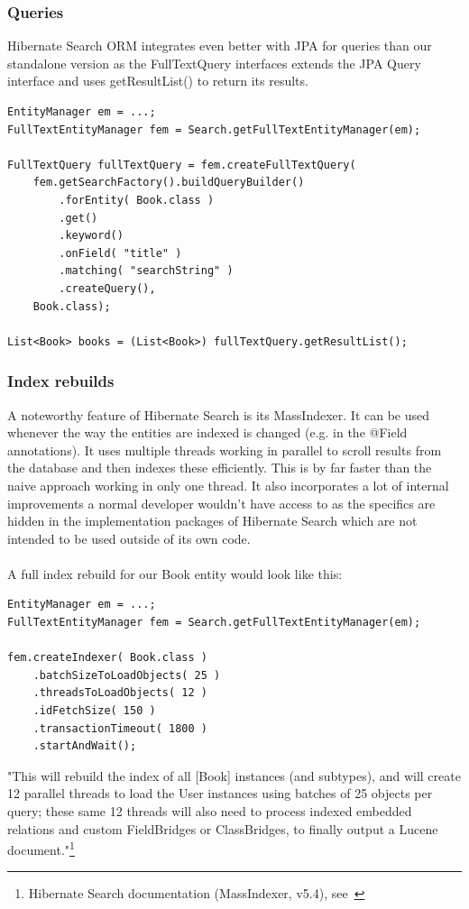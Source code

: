 \pagebreak

\subsubsection{Queries} \label{hsearch_orm_querying}
Hibernate Search ORM integrates even better with JPA for queries than our standalone version as the FullTextQuery interfaces extends the JPA Query interface and uses getResultList() to return its results.
\\
\lstset{language=java}
\begin{lstlisting}[frame=htrbl, caption={Querying with Hibernate Search ORM}, label={lst:querying_hsearch_orm.java_1}]
EntityManager em = ...;
FullTextEntityManager fem = Search.getFullTextEntityManager(em);

FullTextQuery fullTextQuery = fem.createFullTextQuery(
	fem.getSearchFactory().buildQueryBuilder()
		.forEntity( Book.class )
		.get()
		.keyword()
		.onField( "title" )
		.matching( "searchString" )
		.createQuery(), 
	Book.class);
	
List<Book> books = (List<Book>) fullTextQuery.getResultList();
\end{lstlisting}

\pagebreak

\subsubsection{Index rebuilds}
A noteworthy feature of Hibernate Search is its MassIndexer. It can be used whenever the way the entities are indexed is changed (e.g. in the @Field annotations). It uses multiple threads working in parallel to scroll results from the database and then indexes these efficiently. This is by far faster than the naive approach working in only one thread. It also incorporates a lot of internal improvements a normal developer wouldn't have access to as the specifics are hidden in the implementation packages of Hibernate Search which are not intended to be used outside of its own code.
\\\\
A full index rebuild for our Book entity would look like this:
\\
\lstset{language=java}
\begin{lstlisting}[frame=htrbl, caption={MassIndexer usage with Hibernate Search ORM}, label={lst:massindexing_hsearch_orm.java}]
EntityManager em = ...;
FullTextEntityManager fem = Search.getFullTextEntityManager(em);

fem.createIndexer( Book.class )
	.batchSizeToLoadObjects( 25 )
	.threadsToLoadObjects( 12 )
	.idFetchSize( 150 )
	.transactionTimeout( 1800 )
	.startAndWait();
\end{lstlisting}
\noindent
"This will rebuild the index of all [Book] instances (and subtypes), and will create 12 parallel threads to load the User instances using batches of 25 objects per query; these same 12 threads will also need to process indexed embedded relations and custom FieldBridges or ClassBridges, to finally output a Lucene document."\footnote{Hibernate Search documentation (MassIndexer, v5.4), see~\cite{hibernate_search_doc_massindexer}}


